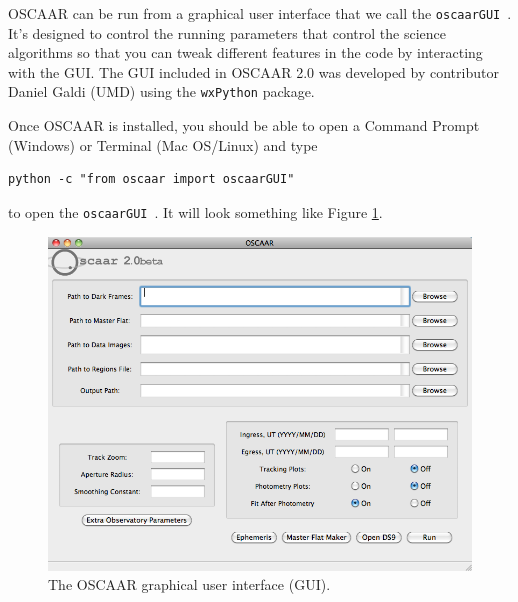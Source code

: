 \documentclass[a4paper]{article}
\newcommand{\code}[1]{\texttt{#1}}
\newcommand{\gui}{\code{oscaarGUI}~}
\begin{document}
OSCAAR can be run from a graphical user interface that we call the \gui. It's designed to control the running parameters that control the science algorithms so that you can tweak different features in the code by interacting with the GUI. The GUI included in OSCAAR 2.0 was developed by contributor Daniel Galdi (UMD) using the \code{wxPython} package.

Once OSCAAR is installed, you should be able to open a Command Prompt (Windows) or Terminal (Mac OS/Linux) and type

\begin{verbatim}
python -c "from oscaar import oscaarGUI"
\end{verbatim}

\noindent to open the \gui. It will look something like Figure \ref{fig:gui}.

\begin{figure}[H]
\begin{center}
\includegraphics[scale=0.35]{imgs/GUI.png}
\caption{The OSCAAR graphical user interface (GUI).}
\label{fig:gui}
\end{center}	
\end{figure}
\end{document}
